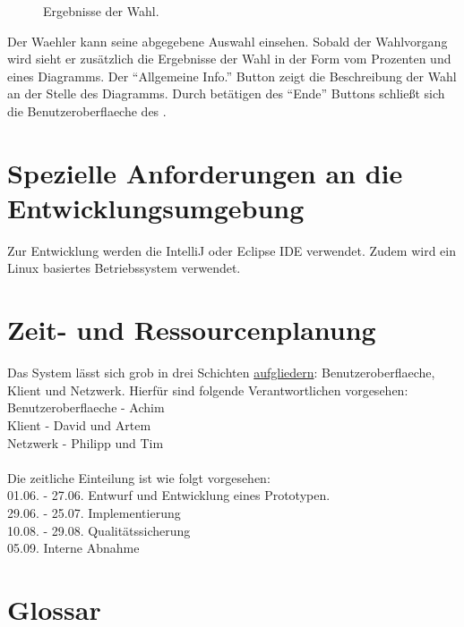 \documentclass[parskip=full,11pt,twoside]{scrartcl}
\begin{document}
\begin{figure}[H]
	\caption{\label{fig:whlr-result}
		Ergebnisse der \gls{Wahl}.
	}
\end{figure}
Der \gls{Waehler} kann seine abgegebene Auswahl einsehen.
Sobald der Wahlvorgang  wird sieht er zusätzlich die Ergebnisse der \gls{Wahl} in der Form vom Prozenten und eines Diagramms.
Der \enquote{Allgemeine Info.} Button zeigt die Beschreibung der \gls{Wahl} an der Stelle des Diagramms.
Durch betätigen des \enquote{Ende} Buttons schließt sich die \gls{Benutzeroberflaeche} des .


\pagebreak

\section{Spezielle Anforderungen an die Entwicklungsumgebung}
Zur Entwicklung werden die IntelliJ oder Eclipse IDE verwendet.
Zudem wird ein \gls{Linux} basiertes Betriebssystem verwendet.

\section{Zeit- und Ressourcenplanung}
Das System lässt sich grob in drei Schichten \hyperref[fig:sysArch]{aufgliedern}: \gls{Benutzeroberflaeche}, \gls{Klient} und \gls{Netzwerk}. Hierfür sind folgende Verantwortlichen vorgesehen:\\
\gls{Benutzeroberflaeche} - Achim\\
\gls{Klient} - David und Artem\\
\gls{Netzwerk} - Philipp und Tim\\
\\
Die zeitliche Einteilung ist wie folgt vorgesehen:\\
01.06. - 27.06. Entwurf und Entwicklung eines Prototypen.\\
29.06. - 25.07. Implementierung\\
10.08. - 29.08. Qualitätssicherung\\
05.09. Interne Abnahme

\section{Glossar}
\printglossaries
\end{document}
